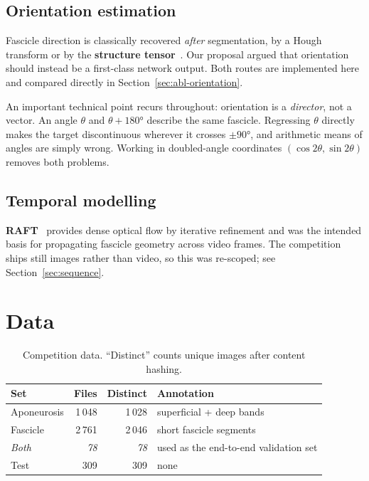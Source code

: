 \documentclass[11pt,a4paper]{article}
\begin{document}
\subsection{Orientation estimation}

Fascicle direction is classically recovered \emph{after} segmentation, by a Hough
transform or by the \textbf{structure tensor}~\citep{knutsson1989tensor}. Our
proposal argued that orientation should instead be a first-class network output.
Both routes are implemented here and compared directly in
Section~\ref{sec:abl-orientation}.

An important technical point recurs throughout: orientation is a \emph{director},
not a vector. An angle $\theta$ and $\theta+\ang{180}$ describe the same
fascicle. Regressing $\theta$ directly makes the target discontinuous wherever it
crosses $\pm\ang{90}$, and arithmetic means of angles are simply wrong. Working
in doubled-angle coordinates $(\cos 2\theta, \sin 2\theta)$ removes both
problems.

\subsection{Temporal modelling}

\textbf{RAFT}~\citep{teed2020raft} provides dense optical flow by iterative
refinement and was the intended basis for propagating fascicle geometry across
video frames. The competition ships still images rather than video, so this was
re-scoped; see Section~\ref{sec:sequence}.

\section{Data}
\label{sec:data}

\begin{table}[htbp]
\centering
\caption{Competition data. ``Distinct'' counts unique images after
content hashing.}
\label{tab:data}
\begin{tabular}{lrrl}
\toprule
\textbf{Set} & \textbf{Files} & \textbf{Distinct} & \textbf{Annotation} \\
\midrule
Aponeurosis & 1\,048 & 1\,028 & superficial + deep bands \\
Fascicle    & 2\,761 & 2\,046 & short fascicle segments \\
\textit{Both} & \textit{78} & \textit{78} & used as the end-to-end validation set \\
Test        & 309   & 309   & none \\
\bottomrule
\end{tabular}
\end{table}
\end{document}
